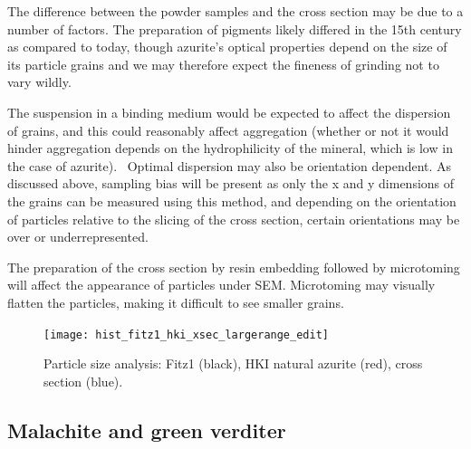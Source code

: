 The difference between the powder samples and the cross section may be due to a number of factors. The preparation of pigments likely differed in the 15th century as compared to today, though azurite's optical properties depend on the size of its particle grains and we may therefore expect the fineness of grinding not to vary wildly. 

The suspension in a binding medium would be expected to affect the dispersion of grains, and this could reasonably affect aggregation (whether or not it would hinder aggregation depends on the hydrophilicity of the mineral, which is low in the case of azurite).~\autocite{Zhang} Optimal dispersion may also be orientation dependent. As discussed above, sampling bias will be present as only the x and y dimensions of the grains can be measured using this method, and depending on the orientation of particles relative to the slicing of the cross section, certain orientations may be over or underrepresented. 

The preparation of the cross section by resin embedding followed by microtoming will affect the appearance of particles under SEM. Microtoming may visually flatten the particles, making it difficult to see smaller grains. 

\begin{figure}[H]
\centering
  \texttt{[image: hist\_fitz1\_hki\_xsec\_largerange\_edit]}
\caption[Particle size analysis: HKI natural azurite, Fitz1, cross section]{Particle size analysis: Fitz1 (black), HKI natural azurite (red), cross section (blue).} 
\label{fig:hist_all}
\end{figure}




\subsection[Malachite and green verditer]{Malachite and green verditer}
\label{subsection3.1.2}


